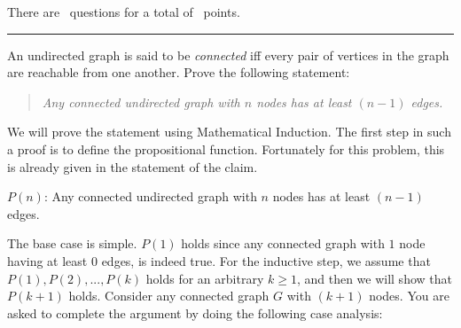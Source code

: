 \documentclass[answers]{exam}
\begin{document}
\vspace{0.1in}
There are \numquestions\, questions for a total of \numpoints\, points.
\vspace{0.1in}
\hrule
 \vspace{0.2in}
\begin{questions}
 
\question An undirected graph is said to be {\em connected} iff every pair of vertices in the graph are reachable from one another. Prove the following statement:
\begin{quote}
{\it Any connected undirected graph with $n$ nodes has at least $(n-1)$ edges.}
\end{quote}

We will prove the statement using Mathematical Induction. The first step in such a proof is to define the propositional function. Fortunately for this problem, this is already given in the statement of the claim. 

$P(n)$: Any connected undirected graph with $n$ nodes has at least $(n-1)$ edges.

The base case is simple. $P(1)$ holds since any connected graph with $1$ node having at least $0$ edges, is indeed true. 
For the inductive step, we assume that $P(1), P(2), ..., P(k)$ holds for an arbitrary $k \geq 1$, and then we will show that $P(k+1)$ holds. Consider any connected graph $G$ with $(k+1)$ nodes. You are asked to complete the argument by doing the following case analysis:

\end{questions}
\end{document}
